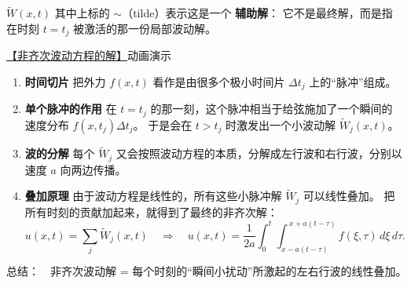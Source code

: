 \begin{definition}[辅助解]
$
\widetilde{W}(x,t)
$
其中上标的 $\sim$（tilde）表示这是一个
\textbf{辅助解}：
它不是最终解，而是指在时刻 $t=t_j$ 被激活的那一份局部波动解。
\end{definition}
\href{https://www.bilibili.com/video/BV1ZTWAzmEUX?vd_source=aa3cbf11c6c44a57861db6554a266722}{【非齐次波动方程的解】}动画演示
\begin{dxtips}[微小脉冲叠加原理]

\begin{enumerate}
  \item \textbf{时间切片}  
  把外力 $f(x,t)$ 看作是由很多个极小时间片 $\Delta t_j$ 上的“脉冲”组成。

  \item \textbf{单个脉冲的作用}  
  在 $t=t_j$ 的那一刻，这个脉冲相当于给弦施加了一个瞬间的速度分布  
  $f(x,t_j)\Delta t_j$。  
  于是会在 $t>t_j$ 时激发出一个小波动解 $\widetilde{W}_j(x,t)$。

  \item \textbf{波的分解}  
  每个 $\widetilde{W}_j$ 又会按照波动方程的本质，分解成左行波和右行波，分别以速度 $a$ 向两边传播。

  \item \textbf{叠加原理}  
  由于波动方程是线性的，所有这些小脉冲解 $\widetilde{W}_j$ 可以线性叠加。  
  把所有时刻的贡献加起来，就得到了最终的非齐次解：
  \[
  u(x,t) = \sum_j \widetilde{W}_j(x,t)
  \quad \Longrightarrow \quad
  u(x,t) = \frac{1}{2a}\int_0^t \int_{x-a(t-\tau)}^{\,x+a(t-\tau)} f(\xi,\tau)\, d\xi\, d\tau.
  \]
\end{enumerate}

\medskip

\[
\text{总结：}\quad
\text{非齐次波动解 = 每个时刻的“瞬间小扰动”所激起的左右行波的线性叠加。}
\]
\end{dxtips}
